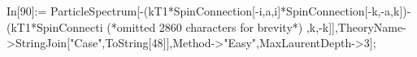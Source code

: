 In[90]:= ParticleSpectrum[-(kT1*SpinConnection[-i,a,i]*SpinConnection[-k,-a,k])-(kT1*SpinConnecti (*omitted 2860 characters for brevity*) ,k,-k]],TheoryName->StringJoin["Case",ToString[48]],Method->"Easy",MaxLaurentDepth->3];